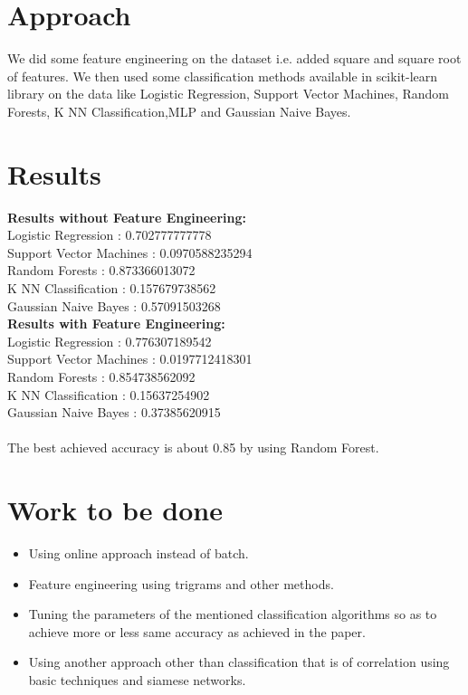 \documentclass[a4paper,10pt]{article}
\begin{document}
\section{Approach}
We did some feature engineering on the dataset i.e. added square and square root of features. We then used some classification methods available in scikit-learn library on the data like Logistic Regression, Support Vector Machines, Random Forests, K NN Classification,MLP and Gaussian Naive Bayes.

\section{Results}

\textbf{Results without Feature Engineering:}\\
Logistic Regression : 0.702777777778\\
Support Vector Machines : 0.0970588235294\\
Random Forests : 0.873366013072\\
K NN Classification : 0.157679738562\\
Gaussian Naive Bayes : 0.57091503268\\
\newline
\textbf{Results with Feature Engineering:}\\
Logistic Regression : 0.776307189542\\
Support Vector Machines : 0.0197712418301\\
Random Forests : 0.854738562092\\
K NN Classification : 0.15637254902\\
Gaussian Naive Bayes : 0.37385620915\\
\\
The best achieved accuracy is about 0.85 by using Random Forest.

\section{Work to be done}
\begin{itemize}
\item Using online approach instead of batch.
\item Feature engineering using trigrams and other methods.
\item Tuning the parameters of the mentioned classification algorithms so as to achieve more or less same accuracy as achieved in the paper.
\item Using another approach other than classification that is of correlation using basic techniques and siamese networks.
\end{itemize}



\end{document}
